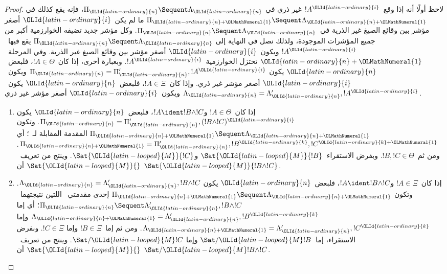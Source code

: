 \documentclass[../../../include/open-logic-section]{subfiles}
\begin{document}
\begin{proof}
لاحظ أولًا أنه إذا وقع~$!A^\OLId{latin-ordinary}{i}$ غير ذري في
$\Pi_\OLId{latin-ordinary}{n} \Sequent \Lambda_\OLId{latin-ordinary}{n}$، فإنه يقع كذلك في
$\Pi_{\OLId{latin-ordinary}{n}+\OLMathNumeral{1}} \Sequent \Lambda_{\OLId{latin-ordinary}{n}+\OLMathNumeral{1}}$ ما لم يكن~$\OLId{latin-ordinary}{i}$ أصغر مؤشر بين وقائع
الصيغ غير الذرية في~$\Pi_\OLId{latin-ordinary}{n} \Sequent \Lambda_\OLId{latin-ordinary}{n}$. وكل مؤشر جديد تضيفه
الخوارزمية أكبر من جميع المؤشرات الموجودة، ولذلك نصل في النهاية إلى
$\Pi_\OLId{latin-ordinary}{n} \Sequent \Lambda_\OLId{latin-ordinary}{n}$ يقع فيها~$!A^\OLId{latin-ordinary}{i}$ ويكون~$\OLId{latin-ordinary}{i}$ أصغر مؤشر بين
وقائع الصيغ غير الذرية. وفي المرحلة~$\OLId{latin-ordinary}{n}+\OLMathNumeral{1}$ تختزل الخوارزمية~$!A^\OLId{latin-ordinary}{i}$.
وبعبارة أخرى، إذا كان~$!A\in\Theta$، فلبعض~$\OLId{latin-ordinary}{n}$ يكون
$\Pi_\OLId{latin-ordinary}{n}=\Pi_\OLId{latin-ordinary}{n}',!A^\OLId{latin-ordinary}{i}$ ويكون~$\OLId{latin-ordinary}{i}$ أصغر مؤشر غير ذري. وإذا كان~$!A\in\Xi$،
فلبعض~$\OLId{latin-ordinary}{n}$ يكون~$\Lambda_\OLId{latin-ordinary}{n}=\Lambda_\OLId{latin-ordinary}{n}',!A^\OLId{latin-ordinary}{i}$ ويكون~$\OLId{latin-ordinary}{i}$ أصغر مؤشر غير ذري.

\begin{enumerate}
  \item إذا كان~$!A\in\Theta$ و$!A\ident !B\land !C$، فلبعض~$\OLId{latin-ordinary}{n}$ يكون
  $\Pi_\OLId{latin-ordinary}{n}=\Pi_\OLId{latin-ordinary}{n}',(!B\land !C)^\OLId{latin-ordinary}{i}$. وتكون
  $\Pi_{\OLId{latin-ordinary}{n}+\OLMathNumeral{1}}\Sequent\Lambda_{\OLId{latin-ordinary}{n}+\OLMathNumeral{1}}$ المقدمة المقابلة لـ~\LeftR{\land}؛ أي
  $\Pi_{\OLId{latin-ordinary}{n}+\OLMathNumeral{1}}=\Pi_\OLId{latin-ordinary}{n}',!B^\OLId{latin-ordinary}{k},!C^{\OLId{latin-ordinary}{k}+\OLMathNumeral{1}}$. ومن ثم~$!B,!C\in\Theta$. وبفرض
  الاستقراء~$\Sat{\OLId{latin-looped}{M}}{!B}$ و$\Sat{\OLId{latin-looped}{M}}{!C}$. وينتج من تعريف~$\Sat{\OLId{latin-looped}{M}}{}$ أن
  $\Sat{\OLId{latin-looped}{M}}{!B\land !C}$.

  \item إذا كان~$!A\in\Xi$ و$!A\ident !B\land !C$، فلبعض~$\OLId{latin-ordinary}{n}$ يكون
  $\Lambda_\OLId{latin-ordinary}{n}=\Lambda_\OLId{latin-ordinary}{n}',!B\land !C$. وتكون
  $\Pi_{\OLId{latin-ordinary}{n}+\OLMathNumeral{1}}\Sequent\Lambda_{\OLId{latin-ordinary}{n}+\OLMathNumeral{1}}$ إحدى مقدمتي~\RightR{\land} اللتين
  نتيجتهما~$\Pi_\OLId{latin-ordinary}{n}\Sequent\Lambda_\OLId{latin-ordinary}{n}',!B\land !C$؛ أي إما
  $\Lambda_{\OLId{latin-ordinary}{n}+\OLMathNumeral{1}}=\Lambda_\OLId{latin-ordinary}{n}',!B^\OLId{latin-ordinary}{k}$ وإما
  $\Lambda_{\OLId{latin-ordinary}{n}+\OLMathNumeral{1}}=\Lambda_\OLId{latin-ordinary}{n}',!C^\OLId{latin-ordinary}{k}$. ومن ثم إما~$!B\in\Xi$ وإما
  $!C\in\Xi$. وبفرض الاستقراء، إما~$\Sat/{\OLId{latin-looped}{M}}{!B}$ وإما
  $\Sat/{\OLId{latin-looped}{M}}{!C}$. وينتج من تعريف~$\Sat{\OLId{latin-looped}{M}}{}$ أن
  $\Sat/{\OLId{latin-looped}{M}}{!B\land !C}$.
  

\end{enumerate}
\end{proof}
\end{document}
